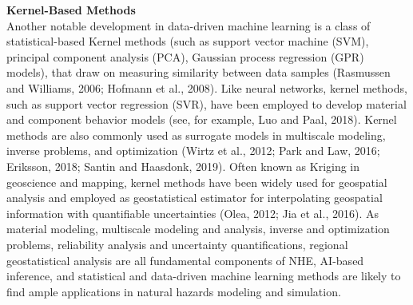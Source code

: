 \noindent\textbf{Kernel-Based Methods} \\Another notable development in data-driven machine learning is a class of statistical-based Kernel methods (such as support vector machine (SVM), principal component analysis (PCA), Gaussian process regression (GPR) models), that draw on measuring similarity between data samples (Rasmussen and Williams, 2006; Hofmann et al., 2008). Like neural networks, kernel methods, such as support vector regression (SVR), have been employed to develop material and component behavior models (see, for example, Luo and Paal, 2018). Kernel methods are also commonly used as surrogate models in multiscale modeling, inverse problems, and optimization (Wirtz et al., 2012; Park and Law, 2016; Eriksson, 2018; Santin and Haasdonk, 2019). Often known as Kriging in geoscience and mapping, kernel methods have been widely used for geospatial analysis and employed as geostatistical estimator for interpolating geospatial information with quantifiable uncertainties (Olea, 2012; Jia et al., 2016). As material modeling, multiscale modeling and analysis, inverse and optimization problems, reliability analysis and uncertainty quantifications, regional geostatistical analysis are all fundamental components of NHE, AI-based inference, and statistical and data-driven machine learning methods are likely to find ample applications in natural hazards modeling and simulation. 
\newline

